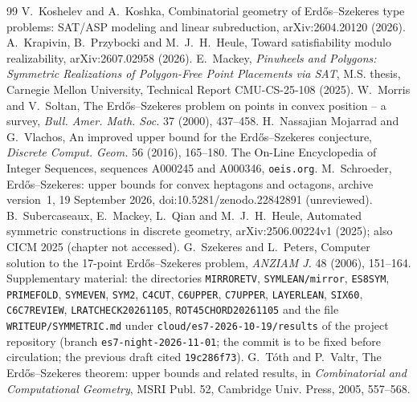 \documentclass[10pt]{article}
\theoremstyle{definition}
\theoremstyle{remark}
\newcommand{\dirn}[1]{{\upshape\nolinkurl{#1}}}
\begin{document}
\begin{thebibliography}{99}
 V.~Koshelev and A.~Koshka, Combinatorial geometry of Erd\H{o}s--Szekeres type problems: SAT/ASP
modeling and linear subreduction, arXiv:2604.20120 (2026).
 A.~Krapivin, B.~Przybocki and M.~J.~H.~Heule, Toward satisfiability modulo realizability,
arXiv:2607.02958 (2026).
 E.~Mackey, \emph{Pinwheels and Polygons: Symmetric Realizations of Polygon-Free Point Placements via
SAT}, M.S. thesis, Carnegie Mellon University, Technical Report CMU-CS-25-108 (2025).
 W.~Morris and V.~Soltan, The Erd\H{o}s--Szekeres problem on points in convex position -- a survey,
\emph{Bull. Amer. Math. Soc.} 37 (2000), 437--458.
 H.~Nassajian Mojarrad and G.~Vlachos, An improved upper bound for the Erd\H{o}s--Szekeres conjecture,
\emph{Discrete Comput. Geom.} 56 (2016), 165--180.
 The On-Line Encyclopedia of Integer Sequences, sequences A000245 and A000346, \texttt{oeis.org}.
 M.~Schroeder, Erd\H{o}s--Szekeres: upper bounds for convex heptagons and octagons, archive version~1,
19 September 2026, doi:10.5281/zenodo.22842891 (unreviewed).
 B.~Subercaseaux, E.~Mackey, L.~Qian and M.~J.~H.~Heule, Automated symmetric constructions in discrete
geometry, arXiv:2506.00224v1 (2025); also CICM 2025 (chapter not accessed).
 G.~Szekeres and L.~Peters, Computer solution to the 17-point Erd\H{o}s--Szekeres problem, \emph{ANZIAM
J.} 48 (2006), 151--164.
 Supplementary material: the directories \dirn{MIRRORETV}, \dirn{SYMLEAN/mirror}, \dirn{ES8SYM},
\dirn{PRIMEFOLD}, \dirn{SYMEVEN}, \dirn{SYM2}, \dirn{C4CUT}, \dirn{C6UPPER}, \dirn{C7UPPER}, \dirn{LAYERLEAN},
\dirn{SIX60}, \dirn{C6C7REVIEW}, \dirn{LRATCHECK20261105}, \dirn{ROT45CHORD20261105} and the file
\dirn{WRITEUP/SYMMETRIC.md} under \dirn{cloud/es7-2026-10-19/results} of the project repository (branch
\texttt{es7-night-2026-11-01}; the commit is to be fixed before circulation; the previous draft cited
\texttt{19c286f73}).
 G.~T\'oth and P.~Valtr, The Erd\H{o}s--Szekeres theorem: upper bounds and related results, in
\emph{Combinatorial and Computational Geometry}, MSRI Publ. 52, Cambridge Univ. Press, 2005, 557--568.
\end{thebibliography}
\end{document}

